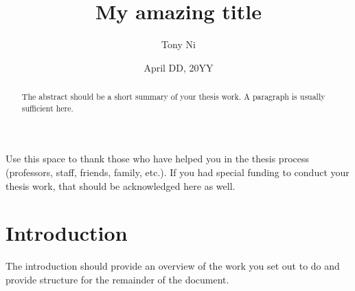 \documentclass[12pt, twoside]{amherstthesis}
\title{My amazing title}
\author{Tony Ni}
\date{April DD, 20YY}
\begin{document}
\doublespace
  \maketitle

\frontmatter %
\pagestyle{fancyplain}

  \begin{abstract}
    The abstract should be a short summary of your thesis work. A paragraph is usually sufficient here.
  \end{abstract}
  \begin{acknowledgments}
    Use this space to thank those who have helped you in the thesis process (professors, staff, friends, family, etc.). If you had special funding to conduct your thesis work, that should be acknowledged here as well.
  \end{acknowledgments}

  \hypersetup{linkcolor=black}
  \setcounter{tocdepth}{2}
  \tableofcontents

  \listoftables

  \listoffigures


\mainmatter %
\pagestyle{fancyplain} %

\hypertarget{intro}{%
\chapter{Introduction}\label{intro}}

The introduction should provide an overview of the work you set out to do and provide structure for the remainder of the document.
\end{document}
